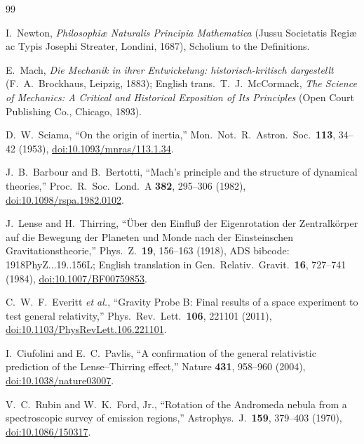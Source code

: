 \documentclass[a4paper,10pt,twocolumn]{ltjsarticle}
\begin{document}
\begin{thebibliography}{99}

I.~Newton, \emph{Philosophi\ae{} Naturalis Principia Mathematica}
(Jussu Societatis Regi\ae{} ac Typis Josephi Streater, Londini, 1687),
Scholium to the Definitions.

E.~Mach, \emph{Die Mechanik in ihrer Entwickelung:
historisch-kritisch dargestellt} (F.~A.~Brockhaus, Leipzig, 1883);
English trans.\ T.~J.~McCormack, \emph{The Science of Mechanics:
A Critical and Historical Exposition of Its Principles}
(Open Court Publishing Co., Chicago, 1893).

D.~W.~Sciama, ``On the origin of inertia,''
Mon.\ Not.\ R.\ Astron.\ Soc.\ \textbf{113}, 34--42 (1953),
\href{https://doi.org/10.1093/mnras/113.1.34}
{doi:10.1093/mnras/113.1.34}.

J.~B.~Barbour and B.~Bertotti, ``Mach's principle and the structure of
dynamical theories,''
Proc.\ R.\ Soc.\ Lond.\ A \textbf{382}, 295--306 (1982),
\href{https://doi.org/10.1098/rspa.1982.0102}
{doi:10.1098/rspa.1982.0102}.

J.~Lense and H.~Thirring, ``\"Uber den Einflu\ss{} der Eigenrotation
der Zentralk\"orper auf die Bewegung der Planeten und Monde nach der
Einsteinschen Gravitationstheorie,''
Phys.\ Z.\ \textbf{19}, 156--163 (1918),
ADS bibcode: 1918PhyZ...19..156L; English translation in
Gen.\ Relativ.\ Gravit.\ \textbf{16}, 727--741 (1984),
\href{https://doi.org/10.1007/BF00759853}{doi:10.1007/BF00759853}.

C.~W.~F.~Everitt \emph{et al.}, ``Gravity Probe B: Final results of a
space experiment to test general relativity,''
Phys.\ Rev.\ Lett.\ \textbf{106}, 221101 (2011),
\href{https://doi.org/10.1103/PhysRevLett.106.221101}
{doi:10.1103/PhysRevLett.106.221101}.

I.~Ciufolini and E.~C.~Pavlis, ``A confirmation of the general
relativistic prediction of the Lense--Thirring effect,''
Nature \textbf{431}, 958--960 (2004),
\href{https://doi.org/10.1038/nature03007}{doi:10.1038/nature03007}.

V.~C.~Rubin and W.~K.~Ford, Jr., ``Rotation of the Andromeda nebula
from a spectroscopic survey of emission regions,''
Astrophys.\ J.\ \textbf{159}, 379--403 (1970),
\href{https://doi.org/10.1086/150317}{doi:10.1086/150317}.


\end{thebibliography}
\end{document}
